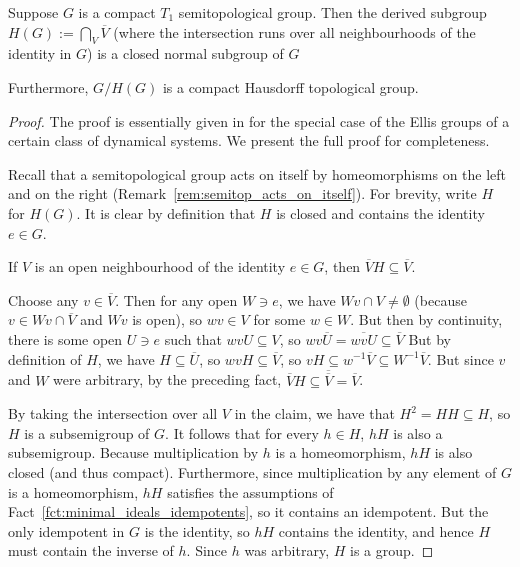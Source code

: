 	\begin{fct}
		\label{fct:semitop_T2_quot}
		Suppose $G$ is a compact $T_1$ semitopological group. Then the derived subgroup $H(G):=\bigcap_V \overline V$ (where the intersection runs over all neighbourhoods of the identity in $G$) is a closed normal subgroup of $G$
		
		Furthermore, $G/H(G)$ is a compact Hausdorff topological group.
	\end{fct}
	\begin{proof}
		The proof is essentially given in \cite{Gl76} for the special case of the Ellis groups of a certain class of dynamical systems. We present the full proof for completeness.
		
		Recall that a semitopological group acts on itself by homeomorphisms on the left and on the right (Remark~\ref{rem:semitop_acts_on_itself}). For brevity, write $H$ for $H(G)$. It is clear by definition that $H$ is closed and contains the identity $e\in G$.
		
		\begin{clm*}
			If $V$ is an open neighbourhood of the identity $e\in G$, then $\overline{V}H\subseteq \overline{V}$.
		\end{clm*}
		\begin{clmproof}
			Choose any $v\in \overline{V}$. Then for any open $W\ni e$, we have $Wv\cap V\neq \emptyset$ (because $v\in Wv\cap \overline{V}$ and $Wv$ is open), so $wv\in V$ for some $w\in W$. But then by continuity, there is some open $U\ni e$ such that $wvU\subseteq V$, so $wv\overline{U}=\overline{wvU}\subseteq\overline V$ But by definition of $H$, we have $H\subseteq \overline{U}$, so $wvH\subseteq \overline{V}$, so $vH\subseteq w^{-1}\overline{V}\subseteq W^{-1}\overline{V}$. But since $v$ and $W$ were arbitrary, by the preceding fact, $\overline{V}H\subseteq \overline{\overline{V}}=\overline{V}$.
		\end{clmproof}
		By taking the intersection over all $V$ in the claim, we have that $H^2=HH\subseteq H$, so $H$ is a subsemigroup of $G$. It follows that for every $h\in H$, $hH$ is also a subsemigroup. Because multiplication by $h$ is a homeomorphism, $hH$ is also closed (and thus compact). Furthermore, since multiplication by any element of $G$ is a homeomorphism, $hH$ satisfies the assumptions of Fact~\ref{fct:minimal_ideals_idempotents}, so it contains an idempotent. But the only idempotent in $G$ is the identity, so $hH$ contains the identity, and hence $H$ must contain the inverse of $h$. Since $h$ was arbitrary, $H$ is a group.
		

\end{proof}
